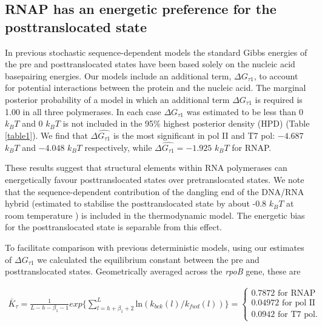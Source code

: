 \documentclass[10pt,letterpaper]{article}
\begin{document}
\subsection*{RNAP has an energetic preference for the posttranslocated state}
In previous stochastic sequence-dependent models \cite{bai2004sequence, tadigotla2006thermodynamic} the standard Gibbs energies of the pre and posttranslocated states have been based solely on the nucleic acid  basepairing energies. Our models include an additional term, $\Delta G_{\tau 1}$, to account for potential interactions between the protein and the nucleic acid. The marginal posterior probability of a model in which an additional term $\Delta G_{\tau 1}$ is required is 1.00 in all three polymerases. In each case $\Delta G_{\tau 1}$ was estimated to be less than 0 $k_BT$ and 0 $k_BT$ is not included in the 95\% highest posterior density (HPD) (Table \ref{table1}). We find that $\Delta \hat{G_{\tau 1}}$ is the most significant in pol II and T7 pol: $-4.687$ $k_BT$  and $-4.048$ $k_BT$ respectively,  while $\Delta \hat{G_{\tau 1}} = -1.925$ $k_BT$ for RNAP. \par

These results suggest that structural elements within RNA polymerases can energetically favour posttranslocated states over pretranslocated states. We note that the sequence-dependent contribution of the dangling end of the DNA/RNA hybrid (estimated to stabilise the posttranslocated state by about -0.8 $k_BT$ at room temperature \cite{santalucia1998unified, bai2004sequence}) is included in the thermodynamic model. The energetic bias for the posttranslocated state is separable from this effect.  \par

To facilitate comparison with previous deterministic models, using our estimates of $\Delta G_{\tau 1}$ we calculated the equilibrium constant between the pre and posttranslocated states. Geometrically averaged across the \textit{rpoB} gene, these are




\begin{eqnarray}
\bar{K}_\tau = \frac{1}{L - h - \beta_1 - 1} exp \{ \sum\limits_{l=h + \beta_1 + 2}^{L} \text{ln} (k_{bck}(l) / k_{fwd}(l)) \} = \begin{cases} 0.7872 \text{ for RNAP} \\ 0.04972 \text{ for pol II} \\ 0.0942 \text{ for T7 pol.}  \end{cases}
\end{eqnarray}
\end{document}
